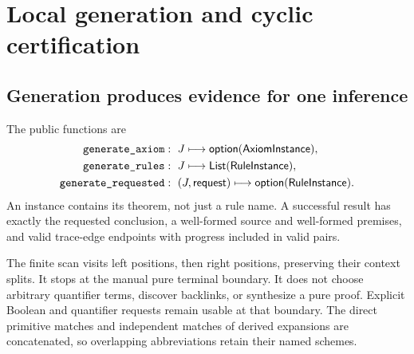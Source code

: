 \section{Local generation and cyclic certification}\label{sec:certification}

\subsection{Generation produces evidence for one inference}
The public functions are
\begin{align*}
 \code{generate_axiom}&:\ J\longmapsto\mathsf{option}(\mathsf{AxiomInstance}),\\
 \code{generate_rules}&:\ J\longmapsto\mathsf{List}(\mathsf{RuleInstance}),\\
 \code{generate_requested}&:\ (J,\mathsf{request})
               \longmapsto\mathsf{option}(\mathsf{RuleInstance}).
\end{align*}
An instance contains its theorem, not just a rule name. A successful result
has exactly the requested conclusion, a well-formed source and well-formed
premises, and valid trace-edge endpoints with progress included in valid pairs.

The finite scan visits left positions, then right positions, preserving their
context splits. It stops at the manual pure terminal boundary. It does not
choose arbitrary quantifier terms, discover backlinks, or synthesize a pure
proof. Explicit Boolean and quantifier requests remain usable at that boundary.
The direct primitive matches and independent matches of derived expansions
are concatenated, so overlapping abbreviations retain their named schemes.

